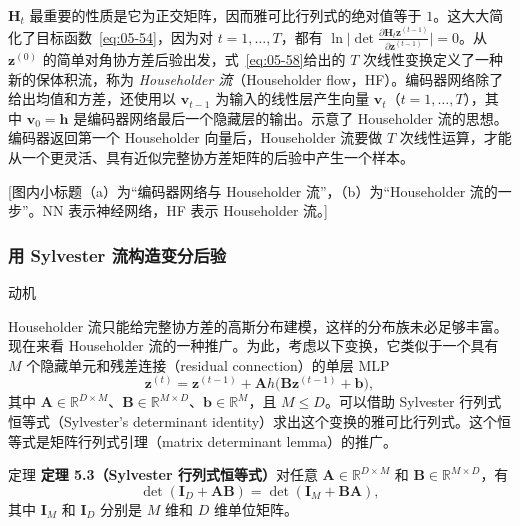 $\mathbf{H}_t$ 最重要的性质是它为正交矩阵，因而雅可比行列式的绝对值等于 $1$。这大大简化了目标函数~\eqref{eq:05-54}，因为对 $t=1,\ldots,T$，都有 $\ln\bigl|\det\frac{\partial\mathbf{H}_t\mathbf{z}^{(t-1)}}{\partial\mathbf{z}^{(t-1)}}\bigr|=0$。从 $\mathbf{z}^{(0)}$ 的简单对角协方差后验出发，式~\eqref{eq:05-58}给出的 $T$ 次线性变换定义了一种新的保体积流，称为 \emph{Householder 流}（Householder flow，HF）。编码器网络除了给出均值和方差，还使用以 $\mathbf{v}_{t-1}$ 为输入的线性层产生向量 $\mathbf{v}_t$（$t=1,\ldots,T$），其中 $\mathbf{v}_0=\mathbf{h}$ 是编码器网络最后一个隐藏层的输出。示意了 Householder 流的思想。编码器返回第一个 Householder 向量后，Householder 流要做 $T$ 次线性运算，才能从一个更灵活、具有近似完整协方差矩阵的后验中产生一个样本。

[图内小标题（a）为“编码器网络与 Householder 流”，（b）为“Householder 流的一步”。NN 表示神经网络，HF 表示 Householder 流。]

\subsubsection[用 Sylvester 流构造变分后验]{用 Sylvester 流构造变分后验 }
\noindent 动机\par\smallskip
Householder 流只能给完整协方差的高斯分布建模，这样的分布族未必足够丰富。现在来看 Householder 流的一种推广。为此，考虑以下变换，它类似于一个具有 $M$ 个隐藏单元和残差连接（residual connection）的单层 MLP
\begin{equation}
\mathbf{z}^{(t)}=\mathbf{z}^{(t-1)}+\mathbf{A} h\bigl(\mathbf{B}\mathbf{z}^{(t-1)}+\mathbf{b}\bigr),
\tag{5.60}\label{eq:05-60}
\end{equation}
其中 $\mathbf{A}\in\mathbb{R}^{D\times M}$、$\mathbf{B}\in\mathbb{R}^{M\times D}$、$\mathbf{b}\in\mathbb{R}^M$，且 $M\leq D$。可以借助 Sylvester 行列式恒等式（Sylvester's determinant identity）求出这个变换的雅可比行列式。这个恒等式是矩阵行列式引理（matrix determinant lemma）的推广。

\begin{booknote}{定理}
\textbf{\hypertarget{thm:05-03}{定理 5.3}（Sylvester 行列式恒等式）}\quad 对任意 $\mathbf{A}\in\mathbb{R}^{D\times M}$ 和 $\mathbf{B}\in\mathbb{R}^{M\times D}$，有
\begin{equation}
\det(\mathbf{I}_D+\mathbf{A}\mathbf{B})=\det(\mathbf{I}_M+\mathbf{B}\mathbf{A}),
\tag{5.61}\label{eq:05-61}
\end{equation}
其中 $\mathbf{I}_M$ 和 $\mathbf{I}_D$ 分别是 $M$ 维和 $D$ 维单位矩阵。
\end{booknote}

